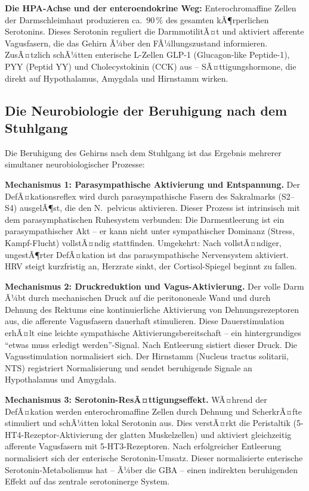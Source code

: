 ﻿\documentclass[12pt,a4paper]{report}
\theoremstyle{plain}
\theoremstyle{definition}
\theoremstyle{remark}
\begin{document}
	\textbf{Die HPA-Achse und der enteroendokrine Weg:}
	Enterochromaffine Zellen der Darmschleimhaut produzieren
	ca.\ $90\,\%$ des gesamten kÃ¶rperlichen Serotonins.
	Dieses Serotonin reguliert die DarmmotilitÃ¤t und
	aktiviert afferente Vagusfasern, die das Gehirn Ã¼ber
	den FÃ¼llungszustand informieren. ZusÃ¤tzlich schÃ¼tten
	enterische L-Zellen GLP-1 (Glucagon-like Peptide-1),
	PYY (Peptid YY) und Cholecystokinin (CCK) aus --
	SÃ¤ttigungshormone, die direkt auf Hypothalamus,
	Amygdala und Hirnstamm wirken.

	\subsection{Die Neurobiologie der Beruhigung nach dem Stuhlgang}

	Die Beruhigung des Gehirns nach dem Stuhlgang ist
	das Ergebnis mehrerer simultaner neurobiologischer Prozesse:

	\textbf{Mechanismus 1: Parasympathische Aktivierung und Entspannung.}
	Der DefÃ¤kationsreflex wird durch parasympathische Fasern
	des Sakralmarks (S2--S4) ausgelÃ¶st, die den N.\ pelvicus aktivieren.
	Dieser Prozess ist intrinsisch mit dem parasymphatischen Ruhesystem
	verbunden: Die Darmentleerung ist ein parasympathischer Akt --
	er kann nicht unter sympathischer Dominanz (Stress, Kampf-Flucht)
	vollstÃ¤ndig stattfinden. Umgekehrt: Nach vollstÃ¤ndiger,
	ungestÃ¶rter DefÃ¤kation ist das parasympathische Nervensystem
	aktiviert. HRV steigt kurzfristig an, Herzrate sinkt,
	der Cortisol-Spiegel beginnt zu fallen.

	\textbf{Mechanismus 2: Druckreduktion und Vagus-Aktivierung.}
	Der volle Darm Ã¼bt durch mechanischen Druck auf die peritononeale
	Wand und durch Dehnung des Rektums eine kontinuierliche
	Aktivierung von Dehnungsrezeptoren aus, die afferente
	Vagusfasern dauerhaft stimulieren.
	Diese Dauerstimulation erhÃ¤lt eine leichte sympathische
	Aktivierungsbereitschaft -- ein hintergrundiges ``etwas muss
	erledigt werden''-Signal. Nach Entleerung sistiert dieser Druck.
	Die Vagusstimulation normalisiert sich. Der Hirnstamm
	(Nucleus tractus solitarii, NTS) registriert Normalisierung
	und sendet beruhigende Signale an Hypothalamus und Amygdala.

	\textbf{Mechanismus 3: Serotonin-ResÃ¤ttigungseffekt.}
	WÃ¤hrend der DefÃ¤kation werden enterochromaffine Zellen
	durch Dehnung und ScherkrÃ¤fte stimuliert und schÃ¼tten
	lokal Serotonin aus. Dies verstÃ¤rkt die Peristaltik
	(5-HT4-Rezeptor-Aktivierung der glatten Muskelzellen)
	und aktiviert gleichzeitig afferente Vagusfasern mit
	5-HT3-Rezeptoren.
	Nach erfolgreicher Entleerung normalisiert sich der
	enterische Serotonin-Umsatz.
	Dieser normalisierte enterische Serotonin-Metabolismus
	hat -- Ã¼ber die GBA -- einen indirekten beruhigenden
	Effekt auf das zentrale serotoninerge System.
\end{document}
